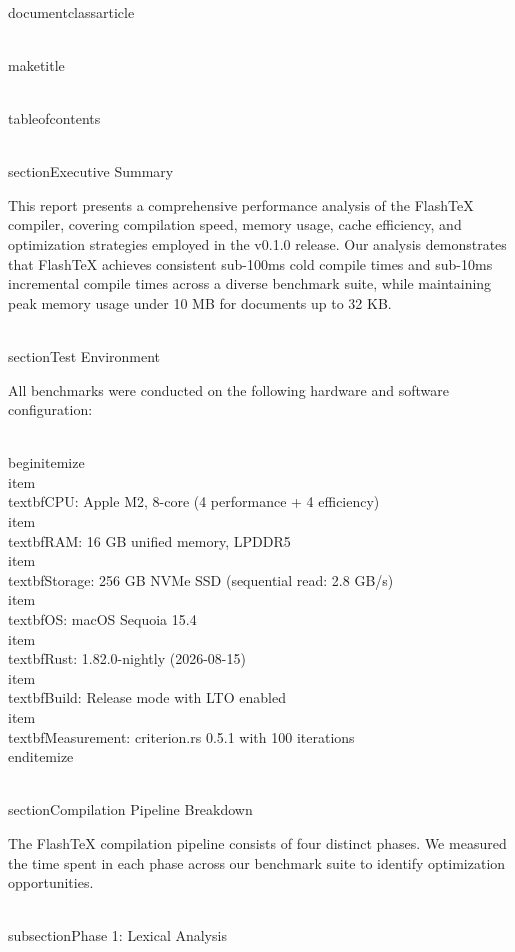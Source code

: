 \\documentclass{article}
\begin{document}
\\maketitle

\\tableofcontents

\\section{Executive Summary}

This report presents a comprehensive performance analysis of the FlashTeX
compiler, covering compilation speed, memory usage, cache efficiency, and
optimization strategies employed in the v0.1.0 release. Our analysis
demonstrates that FlashTeX achieves consistent sub-100ms cold compile times
and sub-10ms incremental compile times across a diverse benchmark suite,
while maintaining peak memory usage under 10 MB for documents up to 32 KB.

\\section{Test Environment}

All benchmarks were conducted on the following hardware and software
configuration:

\\begin{itemize}
  \\item \\textbf{CPU}: Apple M2, 8-core (4 performance + 4 efficiency)
  \\item \\textbf{RAM}: 16 GB unified memory, LPDDR5
  \\item \\textbf{Storage}: 256 GB NVMe SSD (sequential read: 2.8 GB/s)
  \\item \\textbf{OS}: macOS Sequoia 15.4
  \\item \\textbf{Rust}: 1.82.0-nightly (2026-08-15)
  \\item \\textbf{Build}: Release mode with LTO enabled
  \\item \\textbf{Measurement}: criterion.rs 0.5.1 with 100 iterations
\\end{itemize}

\\section{Compilation Pipeline Breakdown}

The FlashTeX compilation pipeline consists of four distinct phases. We
measured the time spent in each phase across our benchmark suite to identify
optimization opportunities.

\\subsection{Phase 1: Lexical Analysis}
\end{document}

